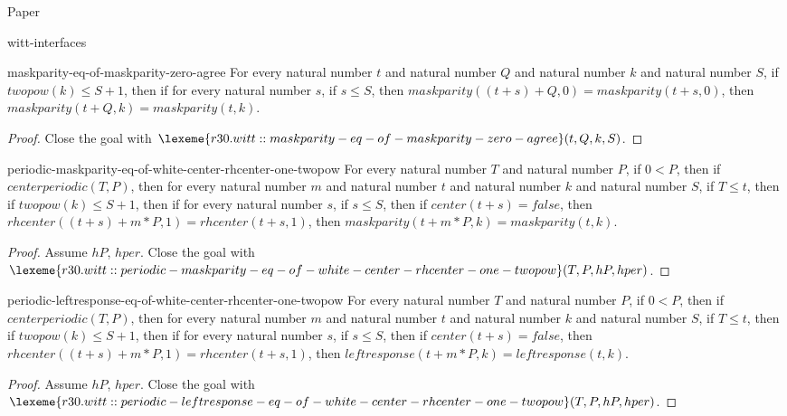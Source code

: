 \begin{lexlean}{Paper}
\begin{section}{witt-interfaces}
  \begin{theorem}{maskparity-eq-of-maskparity-zero-agree}
  For every natural number \(t\) and natural number \(Q\) and natural number \(k\) and natural number \(S\), if \(twopow(k) ≤ S + 1\), then if for every natural number \(s\), if \(s ≤ S\), then \(maskparity((t + s) + Q, 0) = maskparity(t + s, 0)\), then \(maskparity(t + Q, k) = maskparity(t, k)\).
  \begin{proof}
  Close the goal with \(\lexeme{r30.witt::maskparity-eq-of-maskparity-zero-agree}(t, Q, k, S)\).
  \end{proof}
  \end{theorem}

  \begin{theorem}{periodic-maskparity-eq-of-white-center-rhcenter-one-twopow}
  For every natural number \(T\) and natural number \(P\), if \(0 < P\), then if \(centerperiodic(T, P)\), then for every natural number \(m\) and natural number \(t\) and natural number \(k\) and natural number \(S\), if \(T ≤ t\), then if \(twopow(k) ≤ S + 1\), then if for every natural number \(s\), if \(s ≤ S\), then if \(center(t + s) = false\), then \(rhcenter((t + s) + m * P, 1) = rhcenter(t + s, 1)\), then \(maskparity(t + m * P, k) = maskparity(t, k)\).
  \begin{proof}
  Assume \(hP\), \(hper\).
  Close the goal with \(\lexeme{r30.witt::periodic-maskparity-eq-of-white-center-rhcenter-one-twopow}(T, P, hP, hper)\).
  \end{proof}
  \end{theorem}

  \begin{theorem}{periodic-leftresponse-eq-of-white-center-rhcenter-one-twopow}
  For every natural number \(T\) and natural number \(P\), if \(0 < P\), then if \(centerperiodic(T, P)\), then for every natural number \(m\) and natural number \(t\) and natural number \(k\) and natural number \(S\), if \(T ≤ t\), then if \(twopow(k) ≤ S + 1\), then if for every natural number \(s\), if \(s ≤ S\), then if \(center(t + s) = false\), then \(rhcenter((t + s) + m * P, 1) = rhcenter(t + s, 1)\), then \(leftresponse(t + m * P, k) = leftresponse(t, k)\).
  \begin{proof}
  Assume \(hP\), \(hper\).
  Close the goal with \(\lexeme{r30.witt::periodic-leftresponse-eq-of-white-center-rhcenter-one-twopow}(T, P, hP, hper)\).
  \end{proof}
  \end{theorem}


\end{section}
\end{lexlean}
